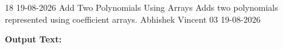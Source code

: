 \clearpage
\label{prog:18}
\programhead
  {18}
  {19-08-2026}
  {Add Two Polynomials Using Arrays}
  {Adds two polynomials represented using coefficient arrays.}
  {Abhishek Vincent}
  {03}
  {19-08-2026}

\divider
\textbf{Output Text:}\par
\vspace{2pt}

